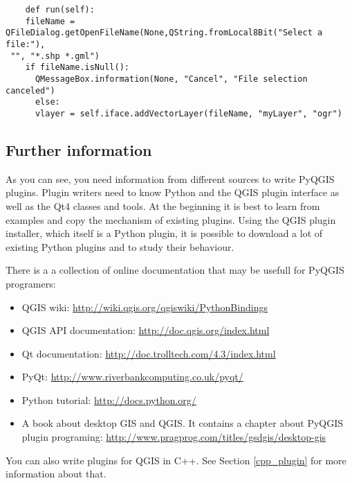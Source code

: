 \begin{verbatim}
    def run(self):
    fileName = QFileDialog.getOpenFileName(None,QString.fromLocal8Bit("Select a file:"),
 "", "*.shp *.gml")
    if fileName.isNull():
      QMessageBox.information(None, "Cancel", "File selection canceled")
      else:
      vlayer = self.iface.addVectorLayer(fileName, "myLayer", "ogr")
\end{verbatim}

\subsection{Further information}

As you can see, you need information from different sources to write PyQGIS
plugins. Plugin writers need to know Python and the QGIS plugin interface as
well as the Qt4 classes and tools. At the beginning it is best to learn from
examples and copy the mechanism of existing plugins. Using the QGIS plugin
installer, which itself is a Python plugin, it is possible to download a lot
of existing Python plugins and to study their behaviour.

There is a a collection of online documentation that may be usefull for
PyQGIS programers:
 
\begin{itemize}
\item QGIS wiki: \url{http://wiki.qgis.org/qgiswiki/PythonBindings}
\item QGIS API documentation: \url{http://doc.qgis.org/index.html}
\item Qt documentation: \url{http://doc.trolltech.com/4.3/index.html}
\item PyQt: \url{http://www.riverbankcomputing.co.uk/pyqt/}
\item Python tutorial: \url{http://docs.python.org/}
\item A book about desktop GIS and QGIS. It contains a chapter about PyQGIS
plugin programing: \url{http://www.pragprog.com/titles/gsdgis/desktop-gis} 
\end{itemize}

You can also write plugins for QGIS in C++. See Section \ref{cpp_plugin} for
more information about that.

